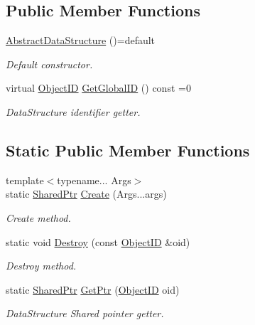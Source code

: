 \subsection*{Public Member Functions}
\begin{DoxyCompactItemize}
\item 
\hyperlink{classshad_1_1AbstractDataStructure_aaf93dd611be143134360cf0b0570ce81}{Abstract\-Data\-Structure} ()=default
\begin{DoxyCompactList}\small\item\em Default constructor. \end{DoxyCompactList}\item 
virtual \hyperlink{classshad_1_1AbstractDataStructure_a8772079d2686692828cfbf342cc2b594}{Object\-I\-D} \hyperlink{classshad_1_1AbstractDataStructure_a914a6e24eec3a7f5d51d93323d3a39cc}{Get\-Global\-I\-D} () const =0
\begin{DoxyCompactList}\small\item\em Data\-Structure identifier getter. \end{DoxyCompactList}\end{DoxyCompactItemize}
\subsection*{Static Public Member Functions}
\begin{DoxyCompactItemize}
\item 
{\footnotesize template$<$typename... Args$>$ }\\static \hyperlink{classshad_1_1AbstractDataStructure_a8bb29450966955c546d40421ce46316f}{Shared\-Ptr} \hyperlink{classshad_1_1AbstractDataStructure_a31b56084146be9afeb69a2b14970aba1}{Create} (Args...\-args)
\begin{DoxyCompactList}\small\item\em Create method. \end{DoxyCompactList}\item 
static void \hyperlink{classshad_1_1AbstractDataStructure_a161d9fddcb57d50c24f187e0b8e23f66}{Destroy} (const \hyperlink{classshad_1_1AbstractDataStructure_a8772079d2686692828cfbf342cc2b594}{Object\-I\-D} \&oid)
\begin{DoxyCompactList}\small\item\em Destroy method. \end{DoxyCompactList}\item 
static \hyperlink{classshad_1_1AbstractDataStructure_a8bb29450966955c546d40421ce46316f}{Shared\-Ptr} \hyperlink{classshad_1_1AbstractDataStructure_a6262772c3f113c09d4d83bba5aab271b}{Get\-Ptr} (\hyperlink{classshad_1_1AbstractDataStructure_a8772079d2686692828cfbf342cc2b594}{Object\-I\-D} oid)
\begin{DoxyCompactList}\small\item\em Data\-Structure Shared pointer getter. \end{DoxyCompactList}\end{DoxyCompactItemize}
